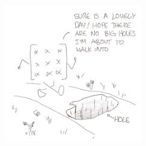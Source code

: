 \begin{titlepage}
    \begin{addmargin}[-1cm]{-3cm}
    \begin{center}
        \large

        \hfill

        \vfill

        \begingroup
            \color{CTtitle}\spacedallcaps{\myTitle} \\ \medskip
        \endgroup
            \mySubtitle \\ \bigskip \\ \bigskip

        \spacedlowsmallcaps{\myName}

        \vfill

        \includegraphics[width=6cm]{gfx/frontart} \\ \medskip



        \vfill

    \end{center}
  \end{addmargin}
\end{titlepage}
